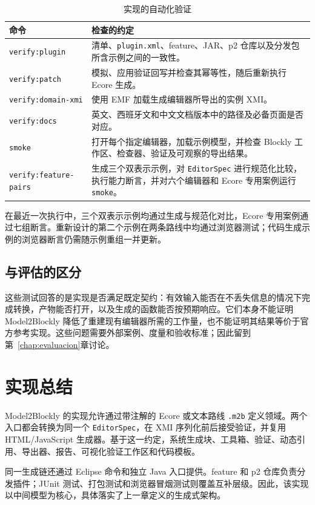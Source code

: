 \begin{table}[H]
  \centering
  \small
  \begin{tabular}{|L{0.27\textwidth}|L{0.58\textwidth}|}
    \hline
    命令 & 检查的约定 \\
    \hline
    \texttt{verify:plugin} & 清单、\texttt{plugin.xml}、feature、JAR、p2 仓库以及分发包所含示例之间的一致性。 \\
    \hline
    \texttt{verify:patch} & 模拟、应用验证回写并检查其幂等性，随后重新执行 Ecore 生成。 \\
    \hline
    \texttt{verify:domain-xmi} & 使用 EMF 加载生成编辑器所导出的实例 XMI。 \\
    \hline
    \texttt{verify:docs} & 英文、西班牙文和中文文档版本中的路径及必备页面是否对应。 \\
    \hline
    \texttt{smoke} & 打开每个指定编辑器，加载示例模型，并检查 Blockly 工作区、检查器、验证及可观察的导出结果。 \\
    \hline
    \texttt{verify:feature-pairs} & 生成三个双表示示例，对 \texttt{EditorSpec} 进行规范化比较，执行能力断言，并对六个编辑器和 Ecore 专用案例运行 \texttt{smoke}。 \\
    \hline
  \end{tabular}
  \caption{实现的自动化验证}
  \label{tab:implementation-verification-commands}
\end{table}

在最近一次执行中，三个双表示示例均通过生成与规范化对比，Ecore 专用案例通过七组断言。重新设计的第二个示例在两条路线中均通过浏览器测试；代码生成示例的浏览器断言仍需随示例重组一并更新。

\subsection{与评估的区分}

这些测试回答的是实现是否满足既定契约：有效输入能否在不丢失信息的情况下完成转换，产物能否打开，以及生成的函数能否按预期响应。它们本身不能证明 Model2Blockly 降低了重建现有编辑器所需的工作量，也不能证明其结果等价于官方参考实现。这些问题需要外部案例、度量和验收标准；因此留到第~\ref{chap:evaluacion}章讨论。

\section{实现总结}
\label{sec:resumen-implementacion}

Model2Blockly 的实现允许通过带注解的 Ecore 或文本路线 \texttt{.m2b} 定义领域。两个入口都会转换为同一个 \texttt{EditorSpec}，在 XMI 序列化前后接受验证，并复用 HTML/JavaScript 生成器。基于这一约定，系统生成块、工具箱、验证、动态引用、导出器、报告、可视化验证工作区和代码模板。

同一生成链还通过 Eclipse 命令和独立 Java 入口提供。feature 和 p2 仓库负责分发插件；JUnit 测试、打包测试和浏览器冒烟测试则覆盖互补层级。因此，该实现以中间模型为核心，具体落实了上一章定义的生成式架构。
